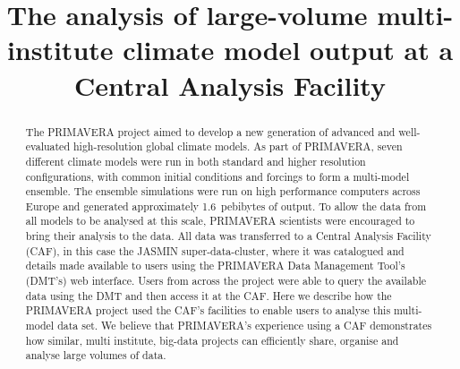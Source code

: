 \documentclass[gmd, manuscript]{copernicus}
\begin{document}
\title{The analysis of large-volume multi-institute climate model output at a Central Analysis Facility}













\received{}
\pubdiscuss{} %
\revised{}
\accepted{}
\published{}




\maketitle



\begin{abstract}
The PRIMAVERA project aimed to develop a new generation of advanced and well-evaluated high-resolution global climate models. As part of PRIMAVERA, seven different climate models were run in both standard and higher resolution configurations, with common initial conditions and forcings to form a multi-model ensemble. The ensemble simulations were run on high performance computers across Europe and generated approximately 1.6~pebibytes of output. To allow the data from all models to be analysed at this scale, PRIMAVERA scientists were encouraged to bring their analysis to the data. All data was transferred to a Central Analysis Facility (CAF), in this case the JASMIN super-data-cluster, where it was catalogued and details made available to users using the PRIMAVERA Data Management Tool's (DMT's) web interface. Users from across the project were able to query the available data using the DMT and then access it at the CAF. Here we describe how the PRIMAVERA project used the CAF's facilities to enable users to analyse this multi-model data set. We believe that PRIMAVERA's experience using a CAF demonstrates how similar, multi institute, big-data projects can efficiently share, organise and analyse large volumes of data.
\end{abstract}
\end{document}
